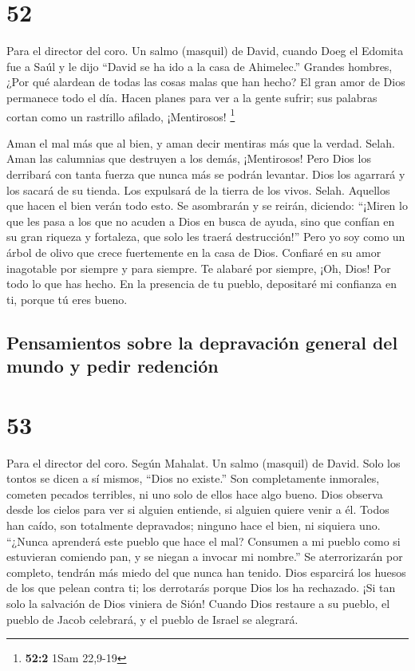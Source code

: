 \hypertarget{section-51}{%
\section{52}\label{section-51}}

Para el director del coro. Un salmo (masquil) de David, cuando Doeg el
Edomita fue a Saúl y le dijo ``David se ha ido a la casa de Ahimelec.''
 Grandes hombres, ¿Por qué alardean de todas las cosas malas
que han hecho? El gran amor de Dios permanece todo el día. 
Hacen planes para ver a la gente sufrir; sus palabras cortan como un
rastrillo afilado, ¡Mentirosos! \footnote{\textbf{52:2} 1Sam 22,9-19}

 Aman el mal más que al bien, y aman decir mentiras más que
la verdad. Selah.  Aman las calumnias que destruyen a los
demás, ¡Mentirosos!  Pero Dios los derribará con tanta
fuerza que nunca más se podrán levantar. Dios los agarrará y los sacará
de su tienda. Los expulsará de la tierra de los vivos. Selah.
 Aquellos que hacen el bien verán todo esto. Se asombrarán y
se reirán, diciendo:  ``¡Miren lo que les pasa a los que no
acuden a Dios en busca de ayuda, sino que confían en su gran riqueza y
fortaleza, que solo les traerá destrucción!''  Pero yo soy
como un árbol de olivo que crece fuertemente en la casa de Dios.
Confiaré en su amor inagotable por siempre y para siempre. 
Te alabaré por siempre, ¡Oh, Dios! Por todo lo que has hecho. En la
presencia de tu pueblo, depositaré mi confianza en ti, porque tú eres
bueno.

\hypertarget{pensamientos-sobre-la-depravaciuxf3n-general-del-mundo-y-pedir-redenciuxf3n-1}{%
\subsection{Pensamientos sobre la depravación general del mundo y pedir
redención}\label{pensamientos-sobre-la-depravaciuxf3n-general-del-mundo-y-pedir-redenciuxf3n-1}}

\hypertarget{section-52}{%
\section{53}\label{section-52}}

Para el director del coro. Según Mahalat. Un salmo (masquil) de David.
 Solo los tontos se dicen a sí mismos, ``Dios no existe.''
Son completamente inmorales, cometen pecados terribles, ni uno solo de
ellos hace algo bueno.  Dios observa desde los cielos para
ver si alguien entiende, si alguien quiere venir a él. 
Todos han caído, son totalmente depravados; ninguno hace el bien, ni
siquiera uno.  ``¿Nunca aprenderá este pueblo que hace el
mal? Consumen a mi pueblo como si estuvieran comiendo pan, y se niegan a
invocar mi nombre.''  Se aterrorizarán por completo, tendrán
más miedo del que nunca han tenido. Dios esparcirá los huesos de los que
pelean contra ti; los derrotarás porque Dios los ha rechazado.
 ¡Si tan solo la salvación de Dios viniera de Sión! Cuando
Dios restaure a su pueblo, el pueblo de Jacob celebrará, y el pueblo de
Israel se alegrará.

